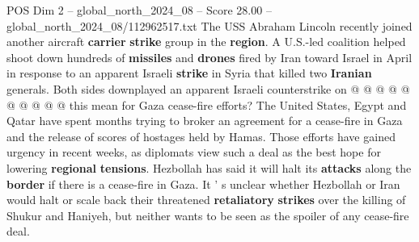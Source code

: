 \begin{textsample}{POS Dim 2 – global\_north\_2024\_08 – Score 28.00 – global\_north\_2024\_08/112962517.txt}
The USS Abraham Lincoln recently joined another aircraft \textbf{carrier} \textbf{strike} group in the \textbf{region}.
A U.S.-led coalition helped shoot down hundreds of \textbf{missiles} and \textbf{drones} fired by Iran toward Israel in April in response to an apparent Israeli \textbf{strike} in Syria that killed two \textbf{Iranian} generals.
Both sides downplayed an apparent Israeli counterstrike on @ @ @ @ @ @ @ @ @ @ this mean for Gaza cease-fire efforts?
The United States, Egypt and Qatar have spent months trying to broker an agreement for a cease-fire in Gaza and the release of scores of hostages held by Hamas.
Those efforts have gained urgency in recent weeks, as diplomats view such a deal as the best hope for lowering \textbf{regional} \textbf{tensions}.
Hezbollah has said it will halt its \textbf{attacks} along the \textbf{border} if there is a cease-fire in Gaza.
It ' s unclear whether Hezbollah or Iran would halt or scale back their threatened \textbf{retaliatory} \textbf{strikes} over the killing of Shukur and Haniyeh, but neither wants to be seen as the spoiler of any cease-fire deal.

\end{textsample}
